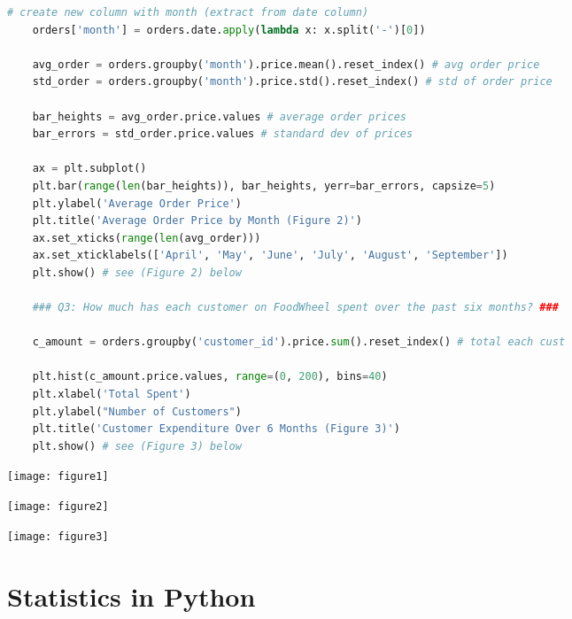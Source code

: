 \documentclass[11pt, a4paper]{article}
\begin{document}
\begin{spacing}{1.1}
\begin{lstlisting}[language=Python]
	# create new column with month (extract from date column)
	orders['month'] = orders.date.apply(lambda x: x.split('-')[0])
	
	avg_order = orders.groupby('month').price.mean().reset_index() # avg order price
	std_order = orders.groupby('month').price.std().reset_index() # std of order price
	
	bar_heights = avg_order.price.values # average order prices
	bar_errors = std_order.price.values # standard dev of prices
	
	ax = plt.subplot()
	plt.bar(range(len(bar_heights)), bar_heights, yerr=bar_errors, capsize=5)
	plt.ylabel('Average Order Price')
	plt.title('Average Order Price by Month (Figure 2)')
	ax.set_xticks(range(len(avg_order)))
	ax.set_xticklabels(['April', 'May', 'June', 'July', 'August', 'September'])
	plt.show() # see (Figure 2) below
	
	### Q3: How much has each customer on FoodWheel spent over the past six months? ###
	
	c_amount = orders.groupby('customer_id').price.sum().reset_index() # total each cust
	
	plt.hist(c_amount.price.values, range=(0, 200), bins=40)
	plt.xlabel('Total Spent')
	plt.ylabel("Number of Customers")
	plt.title('Customer Expenditure Over 6 Months (Figure 3)')
	plt.show() # see (Figure 3) below	\end{lstlisting}\vspace*{1mm}
	\begin{minipage}[c]{5.5cm}
		\texttt{[image: figure1]}
	\end{minipage}
	\begin{minipage}[c]{6cm}
		\texttt{[image: figure2]}
	\end{minipage}
	\begin{minipage}[c]{6cm}
		\texttt{[image: figure3]}
	\end{minipage} \newpage
	
	\section{Statistics in Python}

\end{spacing}
\end{document}
